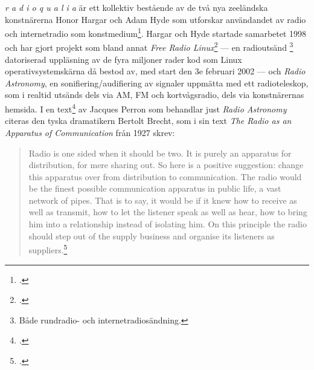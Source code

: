 \documentclass[11pt, a4paper]{article} %
\begin{document}
\emph{r a d i o q u a l i a} är ett kollektiv bestående av de två nya zeeländska konstnärerna Honor Hargar och Adam Hyde som utforskar användandet av radio och internetradio som konstmedium\footcite{noauthor_r_nodate}. Hargar och Hyde startade samarbetet 1998 och har gjort projekt som bland annat \emph{Free Radio Linux}\footcite{noauthor_free_2002} --- en radioutsänd \footnote{Både rundradio- och internetradiosändning.} datoriserad uppläsning av de fyra miljoner rader kod som Linux operativsystemskärna då bestod av, med start den 3e februari 2002 --- och \emph{Radio Astronomy}, en sonifiering/audifiering av signaler uppmätta med ett radioteleskop, som i realtid utsänds dels via AM, FM och kortvågsradio, dels via konstnärernas hemsida. I en text\footcite{perron_radioqualia_2003} av Jacques Perron som behandlar just \emph{Radio Astronomy} citeras den tyska dramatikern Bertolt Brecht, som i sin text \emph{The Radio as an Apparatus of Communication} från 1927 skrev:
\begin{quote}
  Radio is one sided when it should be two. It is purely an apparatus for distribution, for mere sharing out. So here is a positive suggestion: change this apparatus over from distribution to communication. The radio would be the finest possible communication apparatus in public life, a vast network of pipes. That is to say, it would be if it knew how to receive as well as transmit, how to let the listener speak as well as hear, how to bring him into a relationship instead of isolating him. On this principle the radio should step out of the supply business and organise its listeners as suppliers.\footcite{brecht_radio_nodate}
\end{quote}

\end{document}

